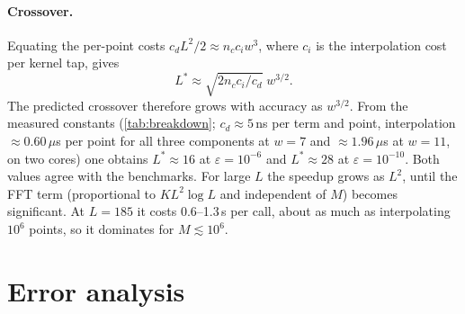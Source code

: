 \documentclass[11pt,a4paper]{article}
\theoremstyle{remark}
\newcommand{\eps}{\varepsilon}
\begin{document}
\paragraph{Crossover.} Equating the per-point costs $c_d L^2/2\approx n_c c_i w^3$, where $c_i$ is
the interpolation cost per kernel tap, gives
\begin{equation}\label{eq:crossover}
L^\ast\approx\sqrt{2n_cc_i/c_d}\;w^{3/2}.
\end{equation}
The predicted crossover therefore grows with accuracy as $w^{3/2}$. From the measured constants
(\cref{tab:breakdown}; $c_d\approx5$\,ns per term and point, interpolation $\approx0.60\,\mu$s per point for all three
components at $w=7$ and $\approx1.96\,\mu$s at $w=11$, on two cores) one obtains $L^\ast\approx16$ at $\eps=10^{-6}$ and
$L^\ast\approx28$ at $\eps=10^{-10}$. Both values agree with the benchmarks. For large $L$ the speedup grows as $L^2$, until
the FFT term (proportional to $KL^2\log L$ and independent of $M$) becomes significant. At $L=185$ it costs 0.6--1.3\,s per call,
about as much as interpolating $10^6$ points, so it dominates for $M\lesssim10^6$.

\section{Error analysis}\label{sec:errors}
\end{document}
